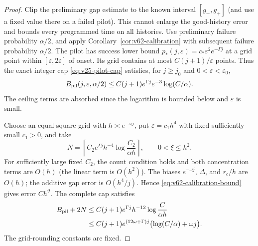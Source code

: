 \begin{proof}
Clip the preliminary gap estimate to the known interval $[g_-,g_+]$
(and use a fixed value there on a failed pilot).  This cannot enlarge
the good-history error and bounds every programmed time on all histories.
Use preliminary failure probability $\alpha/2$, and apply
Corollary~\ref{cor:v62-calibration} with subsequent failure probability
$\alpha/2$.  The pilot has success lower bound
$p_*(j,\varepsilon)=c_*\varepsilon^2e^{-\Gamma j}$ at a grid point
within $[\varepsilon,2\varepsilon]$ of onset.  Its grid contains at
most $C(j+1)/\varepsilon$ points.  Thus the exact integer cap
\eqref{eq:v25-pilot-cap} satisfies, for $j\ge j_0$ and
$0<\varepsilon<\varepsilon_0$,
\begin{equation}\label{eq:v62-pilot-cost}
 B_{\rm pil}(j,\varepsilon,\alpha/2)
 \le C(j+1)e^{\Gamma j}\varepsilon^{-3}\log(C/\alpha).
\end{equation}
The ceiling terms are absorbed since the logarithm is bounded below
and $\varepsilon$ is small.

Choose an equal-square grid with
$h\asymp e^{-\omega j}$, put $\varepsilon=c_1h^4$ with fixed
sufficiently small $c_1>0$, and take
\[
 N=\left\lceil C_2 e^{\Gamma j}h^{-4}
                         \log\frac{C_2}{\alpha h}\right\rceil,
 \qquad 0<\xi\le h^2.
\]
For sufficiently large fixed $C_2$, the count condition holds and
both concentration terms are $O(h)$ (the linear term is $O(h^2)$).
The biases $e^{-\omega j}$, $\Delta$, and $r_c/h$ are $O(h)$;
the additive gap error is $O(h^4/j)$.  Hence
\eqref{eq:v62-calibration-bound} gives error $Ch^\vartheta$.
The complete cap satisfies
\begin{align*}
 B_{\rm pil}+2N
 &\le C(j+1)e^{\Gamma j}h^{-12}
                         \log\frac C{\alpha h} \\
 &\le C(j+1)e^{(12\omega+\Gamma)j}
                              \bigl(\log(C/\alpha)+\omega j\bigr).
\end{align*}
The grid-rounding constants are fixed.


\end{proof}
